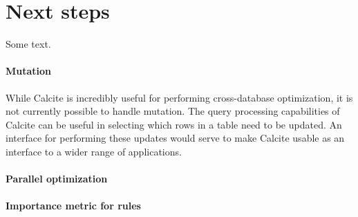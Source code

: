 \section{Next steps}
\label{sec:future}

Some text.

\paragraph{Mutation}

While Calcite is incredibly useful for performing cross-database optimization, it is not currently possible to handle mutation.
The query processing capabilities of Calcite can be useful in selecting which rows in a table need to be updated.
An interface for performing these updates would serve to make Calcite usable as an interface to a wider range of applications.

\paragraph{Parallel optimization}

\paragraph{Importance metric for rules}



